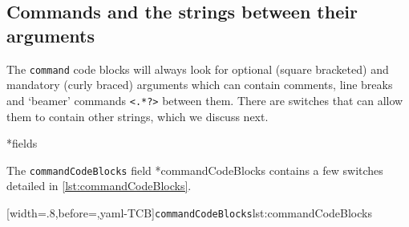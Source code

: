 \subsection{Commands and the strings between their arguments}\label{subsec:commands-string-between} The \texttt{command} code blocks will
 always look for optional (square bracketed) and mandatory (curly braced) arguments which
 can contain comments, line breaks and `beamer' commands \lstinline!<.*?>! between them.
 There are switches that can allow them to contain other strings, which we discuss next.

*{fields}

 The \texttt{commandCodeBlocks} field *{commandCodeBlocks} contains a
 few switches detailed in \cref{lst:commandCodeBlocks}.%

 [width=.8\linewidth,before=\centering,yaml-TCB]{\texttt{commandCodeBlocks}}{lst:commandCodeBlocks}


